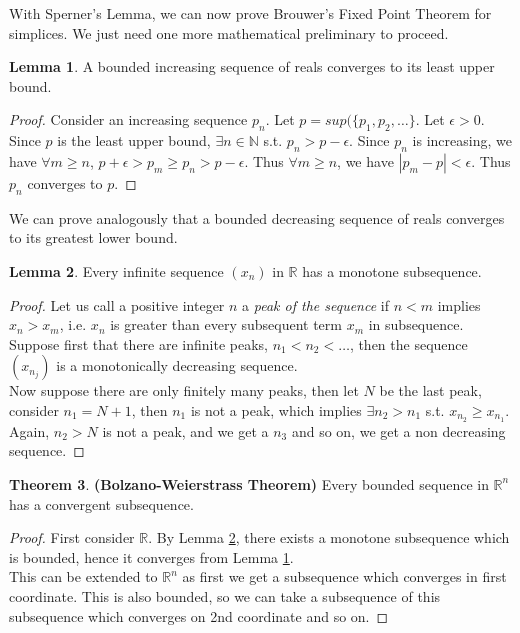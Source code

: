 \documentclass{article}
\theoremstyle{definition}
\newtheorem{theorem}{Theorem}[section]
\newtheorem{lem}[theorem]{Lemma}
\begin{document}
With Sperner's Lemma, we can now prove Brouwer's Fixed Point Theorem for simplices. We just need one more mathematical preliminary to proceed.
\begin{lem}
\label{bound}
A bounded increasing sequence of reals converges to its least upper bound.
\end{lem}
\begin{proof}
Consider an increasing sequence $p_n$. Let $p = sup(\{p_1, p_2, \dots\}$. Let $\epsilon >0$. Since $p$ is the least upper bound, $\exists n\in \mathbb{N}$ s.t. $p_n > p - \epsilon$. Since $p_n$ is increasing, we have $\forall m\geq n$, $p+\epsilon>p_m\geq p_n > p - \epsilon$. Thus $\forall m\geq n$, we have $|p_m - p|<\epsilon$. Thus $p_n$ converges to $p$.
\end{proof}
We can prove analogously that a bounded decreasing sequence of reals converges to its greatest lower bound.
\begin{lem}
\label{monotone}
Every infinite sequence $(x_n)$ in $\mathbb {R}$ has a monotone subsequence.
\end{lem}
\begin{proof}
Let us call a positive integer $n$ a \textit{peak of the sequence} if $n<m$ implies $x_n>x_m$, i.e. $x_n$ is greater than every subsequent term $x_m$ in subsequence.\\

Suppose first that there are infinite peaks, $n_1 < n_2 < \dots$, then the sequence $(x_{n_j})$ is a monotonically decreasing sequence.\\

Now suppose there are only finitely many peaks, then let $N$ be the last peak, consider $n_1 = N+1$, then $n_1$ is not a peak, which implies $\exists n_2 > n_1$ s.t. $x_{n_2}\geq x_{n_1}$. Again, $n_2>N$ is not a peak, and we get a $n_3$ and so on, we get a non decreasing sequence.
\end{proof}
\begin{theorem}
\label{Bolzanno}
\textbf{(Bolzano-Weierstrass Theorem)} Every bounded sequence in $\mathbb{R}^n$ has a convergent subsequence.
\end{theorem}
\begin{proof}
First consider $\mathbb{R}$. By Lemma \ref{monotone}, there exists a monotone subsequence which is bounded, hence it converges from Lemma \ref{bound}.\\

This can be extended to $\mathbb{R}^n$ as first we get a subsequence which converges in first coordinate. This is also bounded, so we can take a subsequence of this subsequence which converges on 2nd coordinate and so on.
\end{proof}
\end{document}
